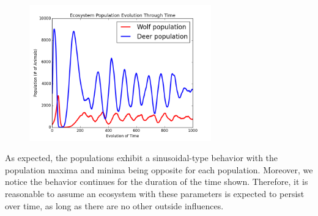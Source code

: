 \documentclass[a4paper,12pt]{article}
\begin{document}
\begin{figure}[H]
   \centering
      \includegraphics[width = 0.7\textwidth]{./pics/Stable_time_evo.png}
\end{figure}

As expected, the populations exhibit a sinusoidal-type behavior with the population maxima and minima being opposite for each population.  Moreover, we notice
the behavior continues for the duration of the time shown.  Therefore, it is reasonable to assume an ecosystem with these parameters is expected to persist
over time, as long as there are no other outside influences.










 


 
\end{document}
